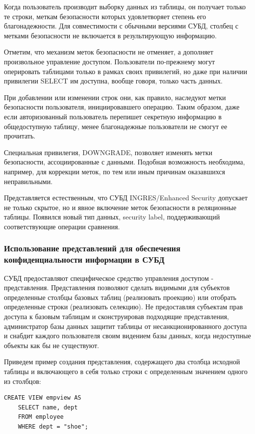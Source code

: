 Когда пользователь производит выборку данных из таблицы, он получает только те строки, меткам
безопасности которых удовлетворяет степень его благонадежности. Для совместимости с обычными
версиями СУБД, столбец с метками безопасности не включается в результирующую информацию.

Отметим, что механизм меток безопасности не отменяет, а дополняет произвольное управление доступом.
Пользователи по-прежнему могут оперировать таблицами только в рамках своих привилегий, но даже при
наличии привилегии SELECT им доступна, вообще говоря, только часть данных.

При добавлении или изменении строк они, как правило, наследуют метки безопасности пользователя,
инициировавшего операцию. Таким образом, даже если авторизованный пользователь перепишет секретную
информацию в общедоступную таблицу, менее благонадежные пользователи не смогут ее прочитать.

Специальная привилегия, DOWNGRADE, позволяет изменять метки безопасности, ассоциированные с
данными. Подобная возможность необходима, например, для коррекции меток, по тем или иным причинам
оказавшихся неправильными.

Представляется естественным, что СУБД INGRES/Enhanced Security допускает не только скрытое, но и
явное включение меток безопасности в реляционные таблицы. Появился новый тип данных, security
label, поддерживающий соответствующие операции сравнения.


\subsubsection{Использование представлений для обеспечения конфиденциальности информации в СУБД}

СУБД предоставляют специфическое средство управления доступом - представления. Представления
позволяют сделать видимыми для субъектов определенные столбцы базовых таблиц (реализовать проекцию)
или отобрать определенные строки (реализовать селекцию). Не предоставляя субъектам прав доступа к
базовым таблицам и сконструировав подходящие представления, администратор базы данных защитит
таблицы от несанкционированного доступа и снабдит каждого пользователя своим видением базы данных,
когда недоступные объекты как бы не существуют.

Приведем пример создания представления, содержащего два столбца исходной таблицы и включающего в
себя только строки с определенным значением одного из столбцов:
\begin{lstlisting}[]
    CREATE VIEW empview AS
    SELECT name, dept
    FROM employee
    WHERE dept = "shoe";
\end{lstlisting}


